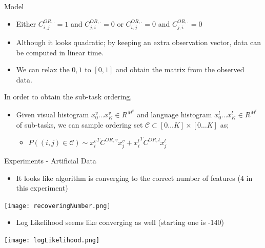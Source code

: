 \begin{frame}{Model}
\begin{itemize}
\item Either $C^{OR,.}_{i,j}=1$ and $C^{OR,.}_{j,i}=0$ or $C^{OR,.}_{i,j}=0$ and $C^{OR,.}_{j,i}=0$
\item Although it looks quadratic; by keeping an extra observation vector, data can be computed in linear time.
\item We can relax the ${0,1}$ to $[0,1]$ and obtain the matrix from the observed data.
\end{itemize}
In order to obtain the sub-task ordering,
\begin{itemize}
\item Given visual histogram $x^v_0 \ldots x^v_K \in R^{M^v}$ and language histogram $x^l_0 \ldots x^l_K \in R^{M^l}$ of sub-tasks, we can sample ordering set $\mathcal{C} \subset [0\ldots K]
 \times [0 \ldots K]$ as;
\begin{itemize}
\item $P((i,j) \in \mathcal{C}) \sim {x^v_i}^T C^{OR,v} x^v_j + {x^l_i}^T C^{OR,l} x^l_j$
\end{itemize}
\end{itemize}
\end{frame}


\begin{frame}{Experiments - Artificial Data}
\begin{itemize}
\item It looks like algorithm is converging to the correct number of features (4 in this experiment)
\end{itemize}
\begin{centering}
\texttt{[image: recoveringNumber.png]}
\end{centering}
\begin{itemize}
\item Log Likelihood seems like converging as well (starting one is -140)
\end{itemize}
\texttt{[image: logLikelihood.png]}

\end{frame}


